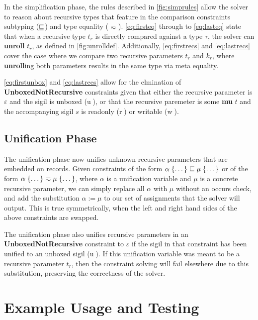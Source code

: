 In the simplification phase, the rules described in \autoref{fig:simprules} allow
the solver to reason about recursive types that feature in the comparison constraints
subtyping ($\sqsubseteq$) and type equality ($\typeeq$). \autoref{eq:firsteq}
through to \autoref{eq:lasteq} state that
when a recursive type $t_r$ is directly compared against a type $\tau$, the solver
can \textbf{unroll} $t_r$, as defined in \autoref{fig:unrolldef}.
Additionally, \autoref{eq:firstrecs} and \autoref{eq:lastrecs} 
cover the case where we compare two recursive parameters
$t_r$ and $k_r$, where \textbf{unroll}ing both parameters results
in the same type via meta equality.

\autoref{eq:firstunbox} and \autoref{eq:lastrecs} allow for the elmination of \textbf{UnboxedNotRecursive} constraints
given that either the recursive parameter is $\varepsilon$ and the sigil is
unboxed (\textcircled{u}), or that the recursive paremeter is some \textbf{mu} $t$ and
the accompanying sigil $s$ is readonly (\textcircled{r}) or writable (\textcircled{w}).

\subsection{Unification Phase}

The unification phase now unifies unknown recursive parameters that are embedded
on records. Given constraints of the form 
$\alpha\; \{ \dots \} \sqsubseteq \mu\; \{ \dots \}$ or of the form
$\alpha\; \{ \dots \} \typeeq \mu\; \{ \dots \}$, where $\alpha$ is a unification
variable and $\mu$ is a concrete recursive parameter, we can simply replace all
$\alpha$ with $\mu$ without an occurs check, and add the substitution 
$\alpha := \mu$ to our set of assignments that the solver will output. 
This is true symmetrically, when the left and right hand sides of the above
constraints are swapped.

The unification phase also unifies recursive parameters in an \textbf{UnboxedNotRecursive}
constraint to $\varepsilon$ if the sigil in that constraint has been unified to
an unboxed sigil (\textcircled{u}). If this unification variable was meant to be a recursive
parameter $t_r$, then the constraint solving will fail elsewhere due to this substitution,
preserving the correctness of the solver.


\section{Example Usage and Testing}
\label{ch:examplesandtesting}

